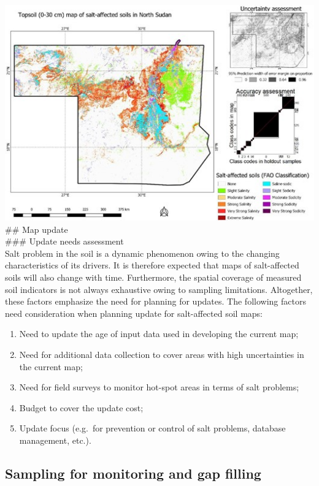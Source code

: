 \documentclass[
  10pt,
  b5paper,
]{book}
\providecommand{\tightlist}{%
  \setlength{\itemsep}{0pt}\setlength{\parskip}{0pt}}
\begin{document}
\includegraphics{figures/images/Figure5.17.jpg}
\#\# Map update\\
\#\#\# Update needs assessment\\
Salt problem in the soil is a dynamic phenomenon owing to the changing characteristics of its drivers. It is therefore expected that maps of salt-affected soils will also change with time. Furthermore, the spatial coverage of measured soil indicators is not always exhaustive owing to sampling limitations. Altogether, these factors emphasize the need for planning for updates. The following factors need consideration when planning update for salt-affected soil maps:

\begin{enumerate}
\def\labelenumi{\alph{enumi})}
\tightlist
\item
  Need to update the age of input data used in developing the current map;
\item
  Need for additional data collection to cover areas with high uncertainties in the current map;
\item
  Need for field surveys to monitor hot-spot areas in terms of salt problems;
\item
  Budget to cover the update cost;
\item
  Update focus (e.g.~for prevention or control of salt problems, database management, etc.).
\end{enumerate}

\hypertarget{sampling-for-monitoring-and-gap-filling}{%
\subsection{Sampling for monitoring and gap filling}\label{sampling-for-monitoring-and-gap-filling}}
\end{document}
